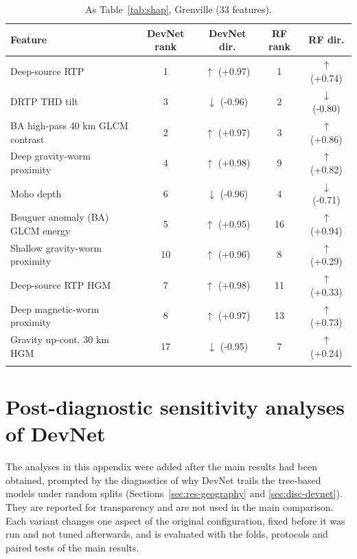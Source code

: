 \documentclass[pdflatex,sn-apa]{sn-jnl}
\begin{document}
\begin{appendices}
\begin{table}[!h]
\caption{As Table~\ref{tab:shap}, Grenville (33 features).}\label{tab:shap-gren}
\footnotesize
\begin{tabular*}{\textwidth}{@{\extracolsep\fill}lcccc}
\toprule
Feature & DevNet rank & DevNet dir. & RF rank & RF dir. \\
\midrule
Deep-source RTP & 1 & $\uparrow$ (+0.97) & 1 & $\uparrow$ (+0.74) \\
DRTP THD tilt & 3 & $\downarrow$ (-0.96) & 2 & $\downarrow$ (-0.80) \\
BA high-pass 40 km GLCM contrast & 2 & $\uparrow$ (+0.97) & 3 & $\uparrow$ (+0.86) \\
Deep gravity-worm proximity & 4 & $\uparrow$ (+0.98) & 9 & $\uparrow$ (+0.82) \\
Moho depth & 6 & $\downarrow$ (-0.96) & 4 & $\downarrow$ (-0.71) \\
Bouguer anomaly (BA) GLCM energy & 5 & $\uparrow$ (+0.95) & 16 & $\uparrow$ (+0.94) \\
Shallow gravity-worm proximity & 10 & $\uparrow$ (+0.96) & 8 & $\uparrow$ (+0.29) \\
Deep-source RTP HGM & 7 & $\uparrow$ (+0.98) & 11 & $\uparrow$ (+0.33) \\
Deep magnetic-worm proximity & 8 & $\uparrow$ (+0.97) & 13 & $\uparrow$ (+0.73) \\
Gravity up-cont. 30 km HGM & 17 & $\downarrow$ (-0.95) & 7 & $\uparrow$ (+0.24) \\
\botrule
\end{tabular*}
\end{table}

\section{Post-diagnostic sensitivity analyses of DevNet}\label{app:sensitivity}

The analyses in this appendix were added after the main results had been obtained, prompted by the diagnostics of why DevNet trails the tree-based models under random splits (Sections~\ref{sec:res-geography} and \ref{sec:disc-devnet}). They are reported for transparency and are not used in the main comparison. Each variant changes one aspect of the original configuration, fixed before it was run and not tuned afterwards, and is evaluated with the folds, protocols and paired tests of the main results.


\end{appendices}
\end{document}
